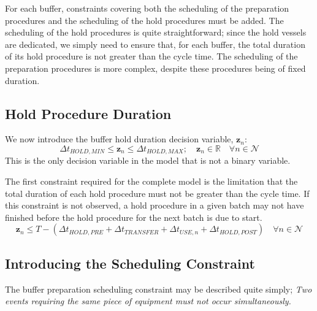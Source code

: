 For each buffer, constraints covering both the scheduling of the preparation
procedures and the scheduling of the hold procedures must be added.
The scheduling of the hold procedures is quite straightforward; since the hold
vessels are dedicated, we simply need to ensure that, for each buffer, the
total duration of its hold procedure is not greater than the cycle time.
The scheduling of the preparation procedures is more complex, despite these
procedures being of fixed duration.

\subsection{Hold Procedure Duration}\label{SS.constr5}

We now introduce the buffer hold duration decision variable, 
$\boldsymbol{z}_{n}$:
\begin{equation}
    \Delta t_{\mathit{HOLD,MIN}} \le \boldsymbol{z}_{n} \le 
    \Delta t_{\mathit{HOLD,MAX}}; \quad
    \boldsymbol{z}_{n} \in \mathbb{R} \quad \forall n \in \mathcal{N}
    \label{eq.z}
\end{equation}
This is the only decision variable in the model that is not a binary variable.

The first constraint required for the complete model is the limitation that the
total duration of each hold procedure must not be greater than the cycle time.
If this constraint is not observed, a hold procedure in a given batch may not
have finished before the hold procedure for the next batch is due to start.
\begin{equation}
    \boldsymbol{z}_{n} \le T - \left( \Delta t_{\mathit{HOLD,PRE}} +
    \Delta t_{\mathit{TRANSFER}} + \Delta t_{\mathit{USE},n} + \Delta
    t_{\mathit{HOLD,POST}} \right) \quad \forall n \in \mathcal{N}
    \label{eq.z1}
\end{equation}

\subsection{Introducing the Scheduling Constraint}\label{SS.schedintro}

The buffer preparation scheduling constraint may be described quite simply;
\emph{Two events requiring the same piece of equipment must not occur
simultaneously.}

